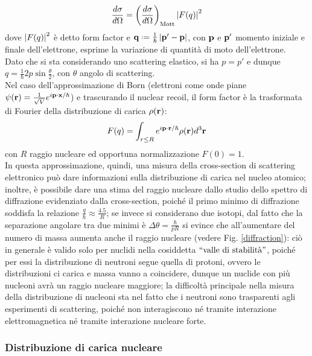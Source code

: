 \begin{equation}
	\frac{d\sigma}{d\Omega} = \left(\frac{d\sigma}{d\Omega}\right)_{\text{Mott}} \left\lvert F(q)\right\rvert^2
	\label{eq:12}
\end{equation}
dove $ \left\lvert F(q)\right\rvert^2 $ è detto form factor e $ \ve{q} \defeq \frac{1}{\hbar} \abs{\ve{p}' - \ve{p}} $, con $ \mathbf{p} $ e $ \mathbf{p}' $ momento iniziale e finale dell'elettrone, esprime la variazione di quantità di moto dell'elettrone.\\
Dato che si sta considerando uno scattering elastico, si ha $ p = p' $ e dunque $ q = \frac{1}{\hbar} 2p \sin \frac{\theta}{2} $, con $ \theta $ angolo di scattering.\\
Nel caso dell'approssimazione di Born (elettroni come onde piane $ \psi(\mathbf{r}) = \frac{1}{\sqrt{V}} e^{i \mathbf{p}\cdot\mathbf{x} / \hbar} $) e trascurando il nuclear recoil, il form factor è la trasformata di Fourier della distribuzione di carica $ \rho(\mathbf{r}) $:
\begin{equation}
	F(q) = \int_{r \le R} e^{i \mathbf{p}\cdot\mathbf{r} / \hbar} \rho(\mathbf{r}) d^3\mathbf{r}
	\label{eq:13}
\end{equation}
con $ R $ raggio nucleare ed opportuna normalizzazione $ F(0) = 1 $.\\
In questa approssimazione, quindi, una misura della cross-section di scattering elettronico può dare informazioni sulla distribuzione di carica nel nucleo atomico; inoltre, è possibile dare una stima del raggio nucleare dallo studio dello spettro di diffrazione evidenziato dalla cross-section, poiché il primo minimo di diffrazione soddisfa la relazione $ \frac{q}{\hbar} \approx \frac{4.5}{R} $; se invece si considerano due isotopi, dal fatto che la separazione angolare tra due minimi è $ \Delta\theta = \frac{\hbar}{p R} $ si evince che all'aumentare del numero di massa aumenta anche il raggio nucleare (vedere Fig. \ref{diffraction}): ciò in generale è valido solo per nuclidi nella cosiddetta $ ``\text{valle di stabilità}" $, poiché per essi la distribuzione di neutroni segue quella di protoni, ovvero le distribuzioni ci carica e massa vanno a coincidere, dunque un nuclide con più nucleoni avrà un raggio nucleare maggiore; la difficoltà principale nella misura della distribuzione di nucleoni sta nel fatto che i neutroni sono trasparenti agli esperimenti di scattering, poiché non interagiscono né tramite interazione elettromagnetica né tramite interazione nucleare forte.

\subsubsection{Distribuzione di carica nucleare}

